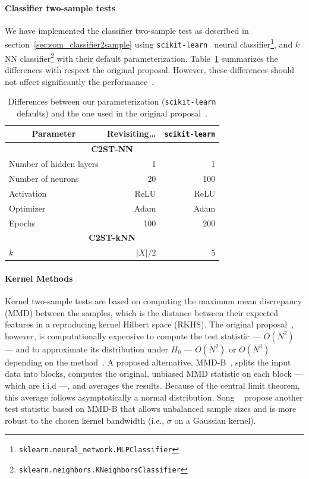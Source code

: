 \paragraph{Classifier two-sample tests}
We have implemented the classifier two-sample test as described in section~\ref{sec:som_classifier2sample}
using \texttt{scikit-learn}~\cite{scikit-learn} neural
classifier\footnote{\texttt{sklearn.neural\_network.MLPClassifier}},
and $k$NN classifier\footnote{\texttt{sklearn.neighbors.KNeighborsClassifier}}
with their default parameterization. Table~\ref{tab:classifier_diff} summarizes the differences
with respect the original proposal. However, these differences should not affect significantly
the performance~\cite{lopez2016revisiting}.

\begin{table}[htpb]
\centering
\begin{tabular}{lrr}
\multicolumn{1}{c}{\bfseries Parameter}       & \bfseries Revisiting\ldots & \texttt{scikit-learn}     \\ \hline
\multicolumn{3}{c}{\bfseries C2ST-NN} \\
Number of hidden layers &  1     &   1    \\
Number of neurons       & 20     & 100    \\
Activation              & ReLU   & ReLU   \\
Optimizer               & Adam   & Adam   \\
Epochs                  & 100    & 200    \\
\multicolumn{3}{c}{\bfseries C2ST-kNN} \\
$k$                     & $|X|/2$ & 5 \\
\end{tabular}
\caption{Differences between our parameterization (\texttt{scikit-learn} defaults) and the one
used in the original proposal~\cite{lopez2016revisiting}.}
\label{tab:classifier_diff}
\end{table}

\paragraph{Kernel Methods}
Kernel two-sample tests are based on computing the maximum mean discrepancy (MMD) between the samples,
which is the distance between their expected features in a reproducing kernel Hilbert space (RKHS).
The original proposal~\cite{gretton2012kernel}, however, is computationally
expensive to compute the test statistic --- $O(N^2)$ --- and to approximate its distribution under
$H_0$ --- $O(N^2)$ or $O(N^3)$ depending on the method~\cite{zaremba2013b}.
A proposed alternative, MMD-B~\cite{zaremba2013b}, splits the input data into blocks, computes the original,
unbiased MMD statistic on each block --- which are i.i.d ---, and averages the results.
Because of the central limit theorem, this average follows asymptotically a normal distribution.
Song \etal~\cite{song2021fast} propose another test statistic based on MMD-B that allows
unbalanced sample sizes and is more robust to the chosen kernel bandwidth (i.e., $\sigma$ on a Gaussian kernel).

